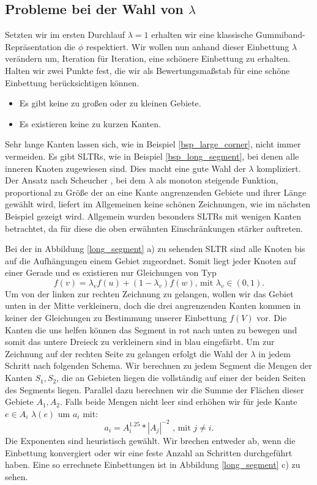 \subsection{Probleme bei der Wahl von $\lambda$}

Setzten wir im ersten Durchlauf $\lambda = 1$ erhalten wir eine klassische Gummiband-Repräsentation die $\phi$ respektiert. Wir wollen nun anhand dieser Einbettung $\lambda$ verändern um, Iteration für Iteration, eine \glqq schönere\grqq{ } Einbettung zu erhalten. Halten wir zwei Punkte fest, die wir als Bewertungsmaßstab für eine schöne Einbettung berücksichtigen können.
\begin{itemize}
\item Es gibt keine zu großen oder zu kleinen Gebiete.
\item Es existieren keine zu kurzen Kanten.
\end{itemize}

Sehr lange Kanten lassen sich, wie in Beispiel \ref{bsp_large_corner}, nicht immer vermeiden. Es gibt SLTRs, wie in Beispiel \ref{bsp_long_segment}, bei denen alle inneren Knoten zugewiesen sind. Dies macht eine gute Wahl der $\lambda$ kompliziert. Der Ansatz nach Scheucher \cite{fs17}, bei dem $\lambda$ als monoton steigende Funktion, proportional zu Größe der an eine Kante angrenzenden Gebiete und ihrer Länge gewählt wird, liefert im Allgemeinen keine schönen Zeichnungen, wie im nächsten Beispiel gezeigt wird. Allgemein wurden besonders SLTRs mit wenigen Kanten betrachtet, da für diese die oben erwähnten Einschränkungen stärker auftreten.

\begin{example}\label{bsp_long_segment}\label{bsp_long_segment}
Bei der in Abbildung \ref{long_segment} a) zu sehenden SLTR sind alle Knoten bis auf die Aufhängungen einem Gebiet zugeordnet. Somit liegt jeder Knoten auf einer Gerade und es existieren nur Gleichungen von Typ
$$ f(v) = \lambda_v f(u) + (1-\lambda_v)f(w) \text{, mit } \lambda_v \in (0,1).$$
Um von der linken zur rechten Zeichnung zu gelangen, wollen wir das Gebiet unten in der Mitte verkleinern, doch die drei angrenzenden Kanten kommen in keiner der Gleichungen zu Bestimmung unserer Einbettung $f(V)$ vor. Die Kanten die uns helfen können das Segment in rot nach unten zu bewegen und somit das untere Dreieck zu verkleinern sind in blau eingefärbt. Um zur Zeichnung auf der rechten Seite zu gelangen erfolgt die Wahl der $\lambda$ in jedem Schritt nach folgenden Schema. Wir berechnen zu jedem Segment die Mengen der Kanten $S_1,S_2$, die an Gebieten liegen die vollständig auf einer der beiden Seiten des Segments liegen. Parallel dazu berechnen wir die Summe der Flächen dieser Gebiete $A_1,A_2$. Falls beide Mengen nicht leer sind erhöhen wir für jede Kante $e \in A_i$ $\lambda(e)$ um $a_i$ mit:
$$ a_i = A_i^{1.25}*|A_j|^{-2} \text{ , mit } j \neq i.$$
Die Exponenten sind heuristisch gewählt. Wir brechen entweder ab, wenn die Einbettung konvergiert oder wir eine feste Anzahl an Schritten durchgeführt haben. Eine so errechnete Einbettungen ist in Abbildung \ref{long_segment} c) zu sehen.
\end{example}

